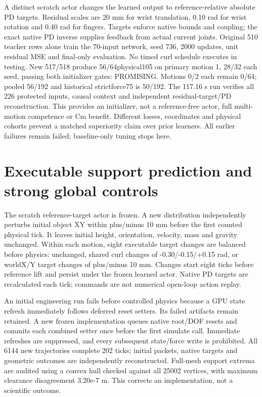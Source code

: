 \documentclass[10 pt]{article}
\begin{document}
A distinct scratch actor changes the learned output to reference-relative absolute
PD targets. Residual scales are 20 mm for wrist translation, 0.10 rad for wrist
rotation and 0.40 rad for fingers. Targets enforce native bounds and coupling;
the exact native PD inverse supplies feedback from actual current joints.
Original 510 teacher rows alone train the 70-input network, seed 736, 2000 updates,
unit residual MSE and final-only evaluation. No timed curl schedule executes
in testing. New 517/518 produce 56/64physical105 on primary motion 1, 28/32 each seed,
passing both initializer gates: PROMISING. Motions 0/2 each remain 0/64;
pooled 56/192 and historical strictforce75 is 50/192. The 117.16 s run verifies all 226
protected inputs, causal context and independent residual-target/PD reconstruction.
This provides an initializer, not a reference-free actor, full multi-motion
competence or Cm benefit. Different losses, coordinates and physical cohorts
prevent a matched superiority claim over prior learners. All earlier failures
remain failed; baseline-only tuning stops here.

\begin{table}[h]
\centering

\caption{Independent learned-policy evaluations: physical105 is the new prospective primary and strictforce75 is a historical secondary. All variants retain all three motions. These are initializer Probes, without Cm or policy-training utility claims.}
\end{table}


\section{Executable support prediction and strong global controls}
The scratch reference-target actor is frozen. A new distribution independently
perturbs initial object XY within plus/minus 10 mm before the first counted physical
tick. It leaves initial height, orientation, velocity, mass and gravity unchanged.
Within each motion, eight executable target changes are balanced before physics:
unchanged, shared curl changes of -0.30/-0.15/+0.15 rad, or worldX/Y target changes
of plus/minus 10 mm. Changes start eight ticks before reference lift and persist
under the frozen learned actor. Native PD targets are recalculated each tick;
commands are not numerical open-loop action replay.

An initial engineering run fails before controlled physics because a GPU state
refresh immediately follows deferred reset setters. Its failed artifacts remain
retained. A new frozen implementation queues native root/DOF resets and commits
each combined setter once before the first simulate call. Immediate refreshes
are suppressed, and every subsequent state/force write is prohibited. All 6144
new trajectories complete 202 ticks; initial packets, native targets and geometric
outcomes are independently reconstructed. Full-mesh support extrema are audited
using a convex hull checked against all 25002 vertices, with maximum clearance
disagreement 3.20e-7 m. This corrects an implementation, not a scientific outcome.
\end{document}
